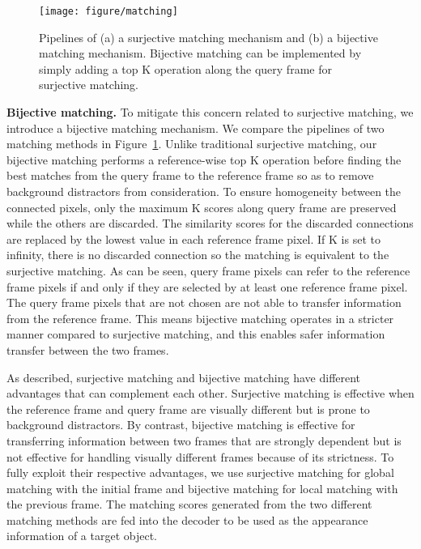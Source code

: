 \documentclass[10pt,twocolumn,letterpaper]{article}
\begin{document}
	
	\begin{figure}[t]
		\centering
		\texttt{[image: figure/matching]}
		\caption{Pipelines of (a) a surjective matching mechanism and (b) a bijective matching mechanism. Bijective matching can be implemented by simply adding a top K operation along the query frame for surjective matching.}
		\label{figure3}
	\end{figure}
	
	
	
	\vspace{1mm}
	\noindent\textbf{Bijective matching.} To mitigate this concern related to surjective matching, we introduce a bijective matching mechanism. We compare the pipelines of two matching methods in Figure~\ref{figure3}. Unlike traditional surjective matching, our bijective matching performs a reference-wise top K operation before finding the best matches from the query frame to the reference frame so as to remove background distractors from consideration. To ensure homogeneity between the connected pixels, only the maximum K scores along query frame are preserved while the others are discarded. The similarity scores for the discarded connections are replaced by the lowest value in each reference frame pixel. If K is set to infinity, there is no discarded connection so the matching is equivalent to the surjective matching. As can be seen, query frame pixels can refer to the reference frame pixels if and only if they are selected by at least one reference frame pixel. The query frame pixels that are not chosen are not able to transfer information from the reference frame. This means bijective matching operates in a stricter manner compared to surjective matching, and this enables safer information transfer between the two frames.
	
	
	As described, surjective matching and bijective matching have different advantages that can complement each other. Surjective matching is effective when the reference frame and query frame are visually different but is prone to background distractors. By contrast, bijective matching is effective for transferring information between two frames that are strongly dependent but is not effective for handling visually different frames because of its strictness. To fully exploit their respective advantages, we use surjective matching for global matching with the initial frame and bijective matching for local matching with the previous frame. The matching scores generated from the two different matching methods are fed into the decoder to be used as the appearance information of a target object.
	
\end{document}

